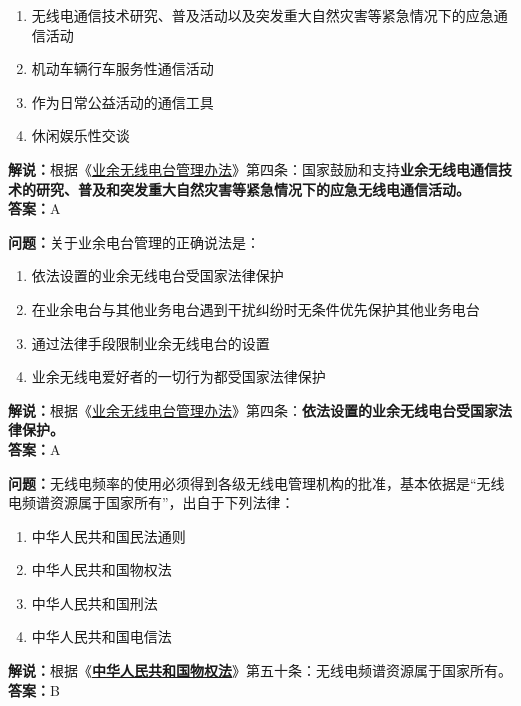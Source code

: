 \begin{enumerate}[label=\Alph*), leftmargin=1.5cm]
	\item 无线电通信技术研究、普及活动以及突发重大自然灾害等紧急情况下的应急通信活动
	\item 机动车辆行车服务性通信活动
	\item 作为日常公益活动的通信工具
	\item 休闲娱乐性交谈
\end{enumerate}

\textbf{解说：}根据《\href{https://www.miit.gov.cn/jgsj/zfs/bmgz/art/2020/art_147b69815b3641caad9047735f94c860.html}{业余无线电台管理办法}》第四条：国家鼓励和支持\textbf{业余无线电通信技术的研究、普及和突发重大自然灾害等紧急情况下的应急无线电通信活动。}\\\textbf{答案：}A


\textbf{问题：}关于业余电台管理的正确说法是：

\begin{enumerate}[label=\Alph*), leftmargin=1.5cm]
	\item 依法设置的业余无线电台受国家法律保护
	\item 在业余电台与其他业务电台遇到干扰纠纷时无条件优先保护其他业务电台
	\item 通过法律手段限制业余无线电台的设置
	\item 业余无线电爱好者的一切行为都受国家法律保护
\end{enumerate}

\textbf{解说：}根据《\href{https://www.miit.gov.cn/jgsj/zfs/bmgz/art/2020/art_147b69815b3641caad9047735f94c860.html}{业余无线电台管理办法}》第四条：\textbf{依法设置的业余无线电台受国家法律保护。}\\\textbf{答案：}A


\textbf{问题：}无线电频率的使用必须得到各级无线电管理机构的批准，基本依据是“无线电频谱资源属于国家所有”，出自于下列法律：

\begin{enumerate}[label=\Alph*), leftmargin=1.5cm]
	\item 中华人民共和国民法通则
	\item 中华人民共和国物权法
	\item 中华人民共和国刑法
	\item 中华人民共和国电信法
\end{enumerate}

\textbf{解说：}根据《\href{http://www.gov.cn/flfg/2007-03/19/content_554452.htm}{\textbf{中华人民共和国物权法}}》第五十条：无线电频谱资源属于国家所有。\\\textbf{答案：}B


